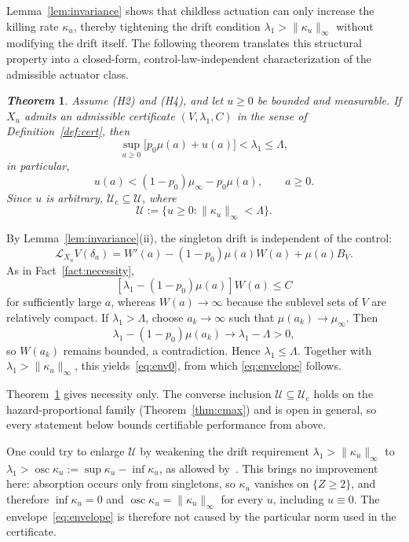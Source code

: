 \documentclass[letterpaper, 10pt, conference]{ieeeconf}
\makeatletter
\newtheorem{theorem}{\it \textbf{Theorem}}
\newcommand{\calU}{\mathcal{U}}
\newcommand{\Lbar}{\Lambda}
\newcommand{\rev}[1]{#1}
\newcommand{\pl}[1]{#1}
\newcommand{\ed}[1]{#1}
\renewenvironment{proof}[1][\proofname]{\par
  \pushQED{\qed}%
  \normalfont\topsep6\p@\@plus6\p@\relax
  \trivlist
  \item[\hskip\labelsep\itshape #1\@addpunct{.}]\ignorespaces
}{%
  \popQED\endtrivlist\@endpefalse
}
\renewenvironment{proof}[1][\proofname]{\par
  \pushQED{\qed}%
  \normalfont\topsep6\p@\@plus6\p@\relax
  \trivlist
  \item[\hskip\labelsep\itshape #1\@addpunct{.}]\ignorespaces
}{%
  \popQED\endtrivlist\@endpefalse
}
\makeatother
\begin{document}
Lemma~\ref{lem:invariance} shows that childless actuation can only increase the
killing rate $\kappa_u$, thereby tightening the drift condition
$\lambda_1>\|\kappa_u\|_\infty$ without modifying the drift itself. The
following theorem translates this structural property into a closed-form,
control-law-independent characterization of the admissible actuator class.
\begin{theorem}
\label{thm:envelope}
\ed{Assume {\rm(H2)} and {\rm(H4)}}, and let $u\ge0$ be bounded \rev{and}
measurable. \ed{If $X_u$ admits an admissible certificate $(V,\lambda_1,C)$
in the sense of Definition~\ref{def:cert}, then}
\begin{equation}
\sup_{a\ge0}\bigl[p_0\mu(a)+u(a)\bigr] < \lambda_1
\le
\Lbar,
\label{eq:env0}
\end{equation}
\rev{in particular,}
\begin{equation}
u(a)  < (1-p_0)\mu_\infty-p_0\mu(a),
\qquad a\ge0.
\label{eq:envelope}
\end{equation}
\rev{Since $u$ is arbitrary, $\calU_{\mathrm c}\subseteq\calU$, where}
\begin{equation}
\rev{\calU:=\{u\ge0:\|\kappa_u\|_\infty<\Lbar\}.}
\label{eq:envclass}
\end{equation}
\end{theorem}
\begin{proof}
By Lemma~\ref{lem:invariance}(ii), the singleton drift is independent of the
control:
\[
\mathcal L_{X_u}V(\delta_a)
=
W'(a)
-(1-p_0)\mu(a)W(a)
+\mu(a)B_V.
\]
As in Fact~\ref{fact:necessity},
\[
[\lambda_1-(1-p_0)\mu(a)]W(a)\le C
\]
for sufficiently large $a$, whereas $W(a)\to\infty$ because the sublevel sets of
$V$ are relatively compact. If $\lambda_1>\Lbar$, choose
$a_k\to\infty$ such that $\mu(a_k)\to\mu_\infty$. Then
\[
\lambda_1-(1-p_0)\mu(a_k)\longrightarrow\lambda_1-\Lbar>0,
\]
so $W(a_k)$ remains bounded, a contradiction. Hence
$\lambda_1\le\Lbar$. Together with
$\lambda_1>\|\kappa_u\|_\infty$, this yields~\eqref{eq:env0}, from which
\eqref{eq:envelope} follows.
\end{proof}

\rev{Theorem~\ref{thm:envelope} gives necessity only. The converse inclusion $\calU\subseteq\calU_{\mathrm c}$ holds on the hazard-proportional family (Theorem~\ref{thm:cmax}) and is open in general, so every statement below bounds certifiable performance from above.}

\rev{\pl{One could try to} enlarge $\calU$ by weakening the drift requirement $\lambda_1>\|\kappa_u\|_\infty$ to $\lambda_1>\operatorname{osc}\kappa_u:=\sup\kappa_u-\inf\kappa_u$, as allowed by~\cite[Rem.~1]{cv1}. This brings no improvement here: absorption occurs only from singletons, so $\kappa_u$ vanishes on $\{Z\ge2\}$, \pl{and therefore} $\inf\kappa_u=0$ and $\operatorname{osc}\kappa_u=\|\kappa_u\|_\infty$ for every $u$, including $u\equiv0$. \pl{The envelope~\eqref{eq:envelope} is therefore not caused by the particular norm used in the certificate.}}
\end{document}
